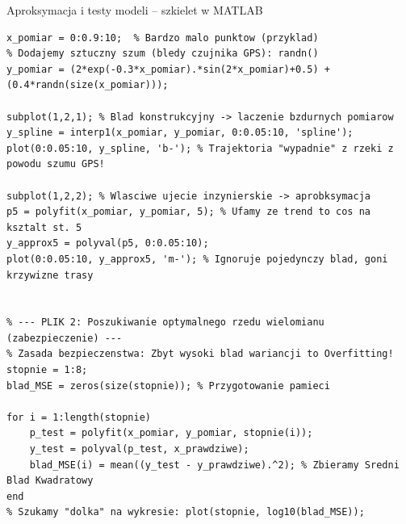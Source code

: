 \documentclass[11pt,aspectratio=169,table]{beamer}
\begin{document}
\begin{frame}[fragile]{Aproksymacja i testy modeli – szkielet w MATLAB}
\begin{lstlisting}[caption={Obrona przed szumem i dobór rzędu w polyfit}]
% --- PLIK 1: Kiedy Interpolacja NISZCZY uklad (zaufanie do zlego pomiaru) ---
x_pomiar = 0:0.9:10;  % Bardzo malo punktow (przyklad)
% Dodajemy sztuczny szum (bledy czujnika GPS): randn()
y_pomiar = (2*exp(-0.3*x_pomiar).*sin(2*x_pomiar)+0.5) + (0.4*randn(size(x_pomiar))); 

subplot(1,2,1); % Blad konstrukcyjny -> laczenie bzdurnych pomiarow
y_spline = interp1(x_pomiar, y_pomiar, 0:0.05:10, 'spline');
plot(0:0.05:10, y_spline, 'b-'); % Trajektoria "wypadnie" z rzeki z powodu szumu GPS!

subplot(1,2,2); % Wlasciwe ujecie inzynierskie -> aprobksymacja
p5 = polyfit(x_pomiar, y_pomiar, 5); % Ufamy ze trend to cos na ksztalt st. 5
y_approx5 = polyval(p5, 0:0.05:10);
plot(0:0.05:10, y_approx5, 'm-'); % Ignoruje pojedynczy blad, goni krzywizne trasy


% --- PLIK 2: Poszukiwanie optymalnego rzedu wielomianu (zabezpieczenie) ---
% Zasada bezpieczenstwa: Zbyt wysoki blad wariancji to Overfitting!
stopnie = 1:8; 
blad_MSE = zeros(size(stopnie)); % Przygotowanie pamieci

for i = 1:length(stopnie)
	p_test = polyfit(x_pomiar, y_pomiar, stopnie(i));
	y_test = polyval(p_test, x_prawdziwe); 
	blad_MSE(i) = mean((y_test - y_prawdziwe).^2); % Zbieramy Sredni Blad Kwadratowy
end
% Szukamy "dolka" na wykresie: plot(stopnie, log10(blad_MSE));
\end{lstlisting}
\end{frame}
\end{document}

